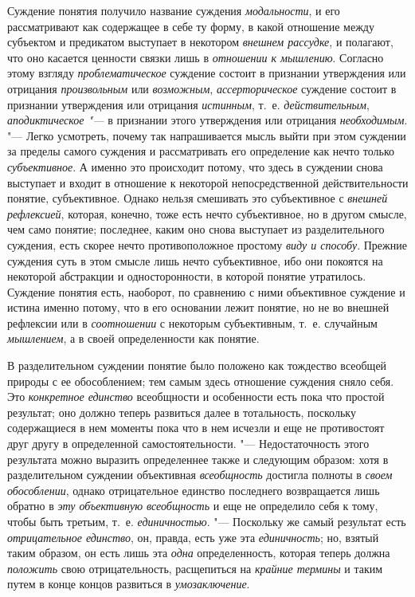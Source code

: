 Суждение понятия получило название суждения
{\em модальности}, и его
рассматривают как содержащее в себе ту форму, в какой отношение между
субъектом и предикатом выступает в некотором
{\em внешнем рассудке}, и
полагают, что оно касается ценности связки лишь в
{\em отношении к мышлению}.
Согласно этому взгляду
{\em проблематическое}
суждение состоит в признании утверждения или отрицания
{\em произвольным} или
{\em возможным},
{\em ассерторическое}
суждение состоит в признании утверждения или отрицания
{\em истинным}, т.~е.
{\em действительным},
{\em аподиктическое "--- }в
признании этого утверждения или отрицания
{\em необходимым}. "---
Легко усмотреть, почему так напрашивается мысль выйти при
этом суждении за пределы самого суждения и рассматривать его определение
как нечто только {\em субъективное}.
А именно это происходит потому, что здесь в суждении снова
выступает и входит в отношение к некоторой непосредственной
действительности понятие, субъективное. Однако нельзя смешивать это
субъективное с {\em внешней
рефлексией}, которая, конечно, тоже есть нечто субъективное,
но в другом смысле, чем само понятие; последнее, каким оно снова выступает
из разделительного суждения, есть скорее нечто противоположное простому
{\em виду и способу}.
Прежние суждения суть в этом смысле лишь нечто субъективное,
ибо они покоятся на некоторой абстракции и односторонности, в которой
понятие утратилось. Суждение понятия есть, наоборот, по сравнению с ними
объективное суждение и истина именно потому, что в его основании лежит
понятие, но не во внешней рефлексии или в
{\em соотношении} с
некоторым субъективным, т.~е. случайным
{\em мышлением}, а в
своей определенности как понятие.

В разделительном суждении понятие было положено как тождество
всеобщей природы с ее обособлением; тем самым здесь отношение суждения
сняло себя. Это {\em конкретное
единство} всеобщности и особенности есть пока что простой
результат; оно должно теперь развиться далее в тотальность, поскольку
содержащиеся в нем моменты пока что в нем исчезли и еще не противостоят
друг другу в определенной самостоятельности. "---
Недостаточность этого результата можно выразить определеннее
также и следующим образом: хотя в разделительном суждении объективная
{\em всеобщность}
достигла полноты в
{\em своем обособлении},
однако отрицательное единство последнего возвращается лишь
обратно в {\em эту объективную
всеобщность} и еще не определило себя к тому, чтобы быть
третьим, т.~е. {\em единичностью}. "---
Поскольку же самый результат есть
{\em отрицательное единство},
он, правда, есть уже эта
{\em единичность}; но,
взятый таким образом, он есть лишь эта
{\em одна}
определенность, которая теперь должна
{\em положить} свою
отрицательность, расщепиться на
{\em крайние термины} и
таким путем в конце концов развиться в
{\em умозаключение}.

